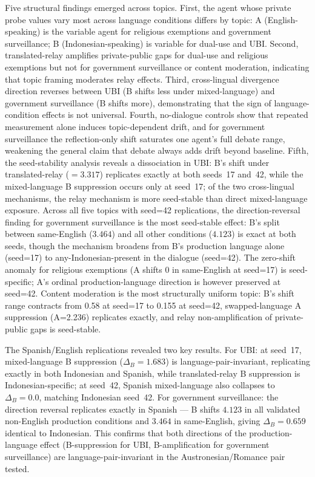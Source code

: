 \documentclass{article}
\begin{document}
Five structural findings emerged across topics. First, the agent whose private probe values vary most across language conditions differs by topic: A (English-speaking) is the variable agent for religious exemptions and government surveillance; B (Indonesian-speaking) is variable for dual-use and UBI. Second, translated-relay amplifies private-public gaps for dual-use and religious exemptions but not for government surveillance or content moderation, indicating that topic framing moderates relay effects. Third, cross-lingual divergence direction reverses between UBI (B shifts less under mixed-language) and government surveillance (B shifts more), demonstrating that the sign of language-condition effects is not universal. Fourth, no-dialogue controls show that repeated measurement alone induces topic-dependent drift, and for government surveillance the reflection-only shift saturates one agent's full debate range, weakening the general claim that debate always adds drift beyond baseline. Fifth, the seed-stability analysis reveals a dissociation in UBI: B's shift under translated-relay ($=3.317$) replicates exactly at both seeds~17 and~42, while the mixed-language B suppression occurs only at seed~17; of the two cross-lingual mechanisms, the relay mechanism is more seed-stable than direct mixed-language exposure. Across all five topics with seed=42 replications, the direction-reversal finding for government surveillance is the most seed-stable effect: B's split between same-English ($3.464$) and all other conditions ($4.123$) is exact at both seeds, though the mechanism broadens from B's production language alone (seed=17) to any-Indonesian-present in the dialogue (seed=42). The zero-shift anomaly for religious exemptions (A shifts 0 in same-English at seed=17) is seed-specific; A's ordinal production-language direction is however preserved at seed=42. Content moderation is the most structurally uniform topic: B's shift range contracts from 0.58 at seed=17 to 0.155 at seed=42, swapped-language A suppression (A=2.236) replicates exactly, and relay non-amplification of private-public gaps is seed-stable.

The Spanish/English replications revealed two key results. For UBI: at seed~17, mixed-language B suppression ($\Delta_B=1.683$) is language-pair-invariant, replicating exactly in both Indonesian and Spanish, while translated-relay B suppression is Indonesian-specific; at seed~42, Spanish mixed-language also collapses to $\Delta_B=0.0$, matching Indonesian seed~42. For government surveillance: the direction reversal replicates exactly in Spanish --- B shifts $4.123$ in all validated non-English production conditions and $3.464$ in same-English, giving $\Delta_B=0.659$ identical to Indonesian. This confirms that both directions of the production-language effect (B-suppression for UBI, B-amplification for government surveillance) are language-pair-invariant in the Austronesian/Romance pair tested.
\end{document}
